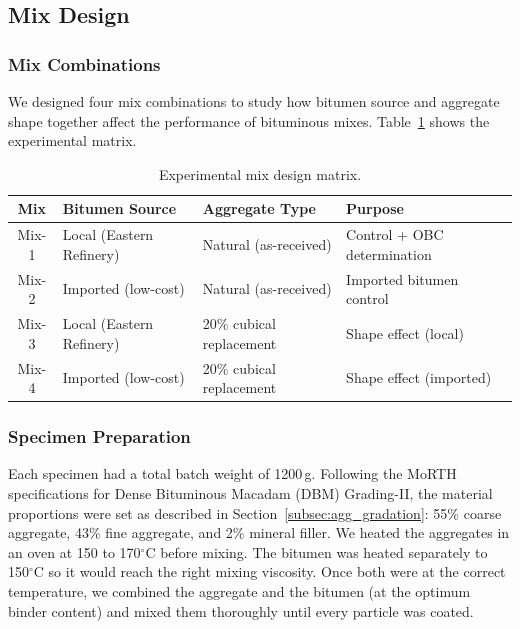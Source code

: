 \documentclass[12pt,a4paper]{article}
\begin{document}
\subsection{Mix Design}

\subsubsection{Mix Combinations}

We designed four mix combinations to study how bitumen source and aggregate shape together affect the performance of bituminous mixes. Table~\ref{tab:mix_matrix} shows the experimental matrix.

\begin{table}[htbp]
    \centering
    \caption{Experimental mix design matrix.}
    \label{tab:mix_matrix}
    \begin{tabular}{@{}clll@{}}
        \toprule
        \textbf{Mix} & \textbf{Bitumen Source} & \textbf{Aggregate Type} & \textbf{Purpose} \\
        \midrule
        Mix-1 & Local (Eastern Refinery) & Natural (as-received) & Control + OBC determination \\
        Mix-2 & Imported (low-cost) & Natural (as-received) & Imported bitumen control \\
        Mix-3 & Local (Eastern Refinery) & 20\% cubical replacement & Shape effect (local) \\
        Mix-4 & Imported (low-cost) & 20\% cubical replacement & Shape effect (imported) \\
        \bottomrule
    \end{tabular}
\end{table}

\subsubsection{Specimen Preparation}

Each specimen had a total batch weight of 1200\,g. Following the MoRTH specifications for Dense Bituminous Macadam (DBM) Grading-II, the material proportions were set as described in Section~\ref{subsec:agg_gradation}: 55\% coarse aggregate, 43\% fine aggregate, and 2\% mineral filler. We heated the aggregates in an oven at 150 to 170$^{\circ}$C before mixing. The bitumen was heated separately to 150$^{\circ}$C so it would reach the right mixing viscosity. Once both were at the correct temperature, we combined the aggregate and the bitumen (at the optimum binder content) and mixed them thoroughly until every particle was coated.
\end{document}
